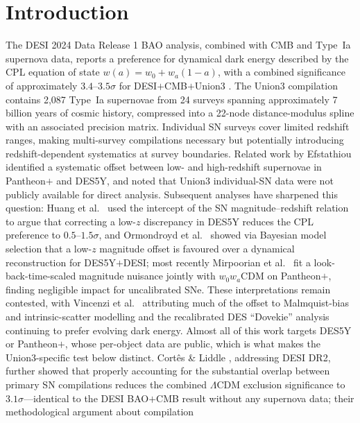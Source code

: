 \documentclass[11pt]{article}
\begin{document}
\section{Introduction}

The DESI 2024 Data Release 1 BAO analysis, combined with CMB and Type~Ia supernova
data, reports a preference for dynamical dark energy described by the CPL equation of
state $w(a)=w_0+w_a(1-a)$, with a combined significance of approximately
$3.4$--$3.5\sigma$ for DESI$+$CMB$+$Union3 \cite{desi2024}. The Union3 compilation
\cite{rubin2025} contains 2,087 Type~Ia supernovae from 24 surveys spanning
approximately 7 billion years of cosmic history, compressed into a 22-node
distance-modulus spline with an associated precision matrix. Individual SN surveys
cover limited redshift ranges, making multi-survey compilations necessary but
potentially introducing redshift-dependent systematics at survey boundaries. Related
work by Efstathiou \cite{efstathiou2025} identified a systematic offset between low-
and high-redshift supernovae in Pantheon$+$ and DES5Y, and noted that Union3
individual-SN data were not publicly available for direct analysis. Subsequent analyses have sharpened this question: Huang et al.\ \cite{huang2025} used the intercept of the SN magnitude--redshift relation to argue that correcting a low-$z$ discrepancy in DES5Y reduces the CPL preference to $0.5$--$1.5\sigma$, and Ormondroyd et al.\ \cite{ormondroyd2026} showed via Bayesian model selection that a low-$z$ magnitude offset is favoured over a dynamical reconstruction for DES5Y$+$DESI; most recently Mirpoorian et al.\ \cite{mirpoorian2026} fit a look-back-time-scaled magnitude nuisance jointly with $w_0w_a$CDM on Pantheon$+$, finding negligible impact for uncalibrated SNe. These interpretations remain contested, with Vincenzi et al.\ \cite{vincenzi2025} attributing much of the offset to Malmquist-bias and intrinsic-scatter modelling and the recalibrated DES ``Dovekie'' analysis \cite{popovic2025} continuing to prefer evolving dark energy. Almost all of this work targets DES5Y or Pantheon$+$, whose per-object data are public, which is what makes the Union3-specific test below distinct. Cort\^es \&
Liddle \cite{cortes2025}, addressing DESI DR2, further showed that properly accounting
for the substantial overlap between primary SN compilations reduces the combined
$\Lambda$CDM exclusion significance to $3.1\sigma$---identical to the DESI BAO$+$CMB
result without any supernova data; their methodological argument about compilation
\end{document}
